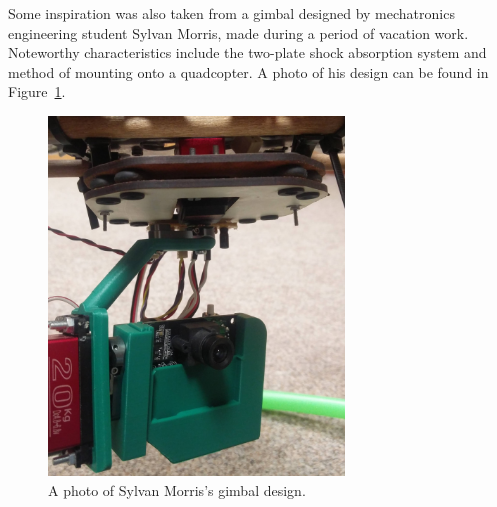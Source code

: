Some inspiration was also taken from a gimbal designed by mechatronics engineering student Sylvan Morris, made during a period of vacation work. Noteworthy characteristics include the two-plate shock absorption system and method of mounting onto a quadcopter. A photo of his design can be found in Figure~\ref{fig:sylvan_gimbal}.

\begin{figure}[ht!]
  \centering
  \includegraphics[width=0.7\textwidth]{literature_review/sylvan_gimbal.jpg}
  \caption{\label{fig:sylvan_gimbal} A photo of Sylvan Morris's gimbal design.}
\end{figure}


